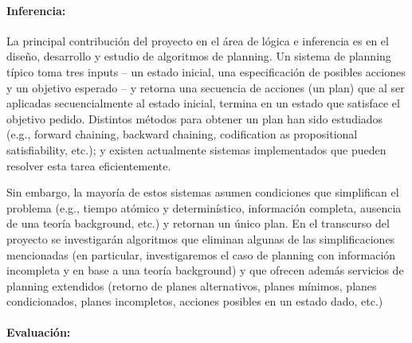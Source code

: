 \paragraph{Inferencia:} La principal contribuci\'on del
proyecto en el \'area de l\'ogica e inferencia es en el
dise\~no, desarrollo y estudio de algoritmos de planning.
Un sistema de planning t\'ipico toma tres inputs -- un
estado inicial, una especificaci\'on de posibles acciones y
un objetivo esperado -- y retorna una secuencia de acciones (un plan)
que al ser aplicadas secuencialmente al estado inicial, termina
en un estado que satisface el objetivo pedido.  Distintos
m\'etodos para obtener un plan han sido estudiados (e.g.,
forward chaining, backward chaining, codification as propositional
satisfiability, etc.); y existen actualmente sistemas
implementados que pueden resolver esta tarea eficientemente.

Sin embargo, la mayor\'ia de estos sistemas asumen condiciones
que simplifican el problema (e.g., tiempo at\'omico y
determin\'istico, informaci\'on completa, ausencia de una teor\'ia
background, etc.) y retornan un \'unico plan.  En el transcurso
del proyecto se investigar\'an algoritmos que eliminan algunas
de las simplificaciones mencionadas (en particular, investigaremos
el caso de planning con informaci\'on incompleta y en base a una
teor\'ia background) y que ofrecen adem\'as servicios de planning
extendidos (retorno de planes alternativos, planes m\'inimos, planes
condicionados, planes incompletos, acciones posibles en un estado dado, etc.)

\paragraph{Evaluaci\'on:}
